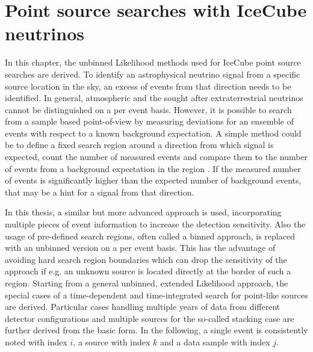 \chapter{Point source searches with IceCube neutrinos}
  \label{chp:pointsource}
In this chapter, the unbinned Likelihood methods used for IceCube point source searches are derived.
To identify an astrophysical neutrino signal from a specific source location in the sky, an excess of events from that direction needs to be identified.
In general, atmospheric and the sought after extraterrestrial neutrinos cannot be distinguished on a per event basis.
However, it is possible to search from a sample based point-of-view by measuring deviations for an ensemble of events with respect to a known background expectation.
A simple method could be to define a fixed search region around a direction from which signal is expected, count the number of measured events and compare them to the number of events from a background expectation in the region \cite{LiMa:1983ApJ}.
If the measured number of events is significantly higher than the expected number of background events, that may be a hint for a signal from that direction.

In this thesis, a similar but more advanced approach is used, incorporating multiple pieces of event information to increase the detection sensitivity.
Also the usage of pre-defined search regions, often called a binned approach, is replaced with an unbinned version on a per event basis.
This has the advantage of avoiding hard search region boundaries which can drop the sensitivity of the approach if e.g. an unknown source is located directly at the border of such a region.
Starting from a general unbinned, extended Likelihood approach, the special cases of a time-dependent and time-integrated search for point-like sources are derived.
Particular cases handling multiple years of data from different detector configurations and multiple sources for the so-called stacking case are further derived from the basic form.
In the following, a single event is consistently noted with index $i$, a source with index $k$ and a data sample with index $j$.

